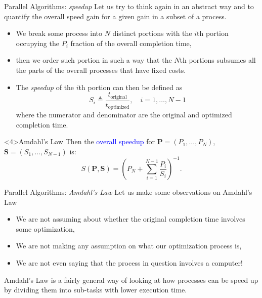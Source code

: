 \documentclass{beamer}
\begin{document}
\begin{frame}{Parallel Algorithms: \emph{speedup}}
\small
Let us try to think again in an abstract way and to quantify the \alert{overall speed gain} for a given gain in a subset of a process.
\begin{itemize}
	\item<1-> We break some process into $N$ distinct portions with the $i$th portion occupying the $P_i$ fraction of the overall completion time,
	\item<2-> then we order such portion in such a way that the $N$th portions subsumes all the parts of the overall processes that have fixed costs.
	\item<3-> The \emph{speedup} of the $i$th portion can then be defined as 
	\begin{equation*}
		S_i \triangleq \frac{t_{\text{original}}}{t_{\text{optimized}}}, \quad i=1,\ldots,N-1
	\end{equation*}
	where the numerator and denominator are the original and optimized completion time.
\end{itemize}
\begin{block}<4>{Amdahl's Law}
Then the \textcolor{blue}{overall speedup} for $\mathbf{P} = (P_1,\ldots,P_N)$, $\mathbf{S} = (S_1,\ldots,S_{N-1})$ is:
\begin{equation*}
S(\mathbf{P},\mathbf{S}) = \left(P_N + \sum_{i=1}^{N-1} \frac{P_i}{S_i}\right)^{-1}.
\end{equation*}
\end{block}

\end{frame}

\begin{frame}{Parallel Algorithms: \emph{Amdahl's Law}}
Let us make some observations on Amdahl's Law
\begin{itemize}
	\item We are not assuming about whether the original completion time  involves some optimization,
	\item We are not making any assumption on what our optimization process is,
	\item We are not even saying that the process in question involves a computer!
\end{itemize}
Amdahl's Law is a fairly general way of looking at how processes can be speed up by dividing them into sub-tasks with lower execution time. 

\end{frame}
\end{document}
